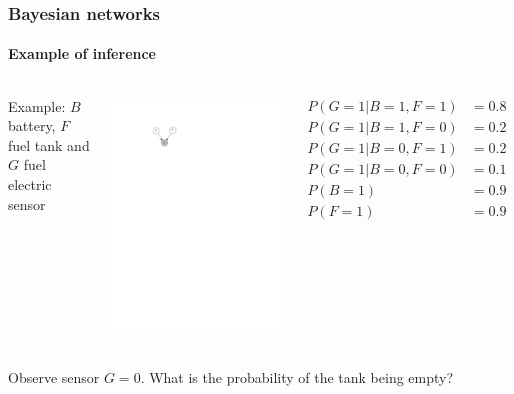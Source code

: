 \documentclass[slidestop,compress,mathserif]{beamer}
\begin{document}
\begin{frame}
	\frametitle{Bayesian networks}
	\framesubtitle{Example of inference}
     \begin{columns}
    \column[c]{6cm}
    Example: $B$ battery, $F$ fuel tank and $G$ fuel electric sensor
    \begin{center}
    \includegraphics[width=.4\textwidth]{fuel}
    \end{center}
    \column[c]{6cm}
    \begin{align*}
    P(G=1|B=1,F=1) & = 0.8\\
    P(G=1|B=1,F=0) & = 0.2\\
    P(G=1|B=0,F=1) & = 0.2\\
    P(G=1|B=0,F=0) & = 0.1\\
    P(B=1) & = 0.9\\
    P(F=1) & = 0.9
    \end{align*}
    \end{columns}
    Observe sensor $G=0$. What is the probability of the tank being empty?
\end{frame}
\end{document}
